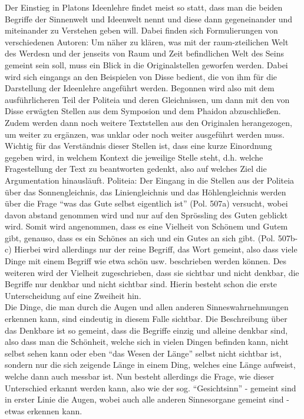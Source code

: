 Der Einstieg in Platons Ideenlehre findet meist so statt, dass man die beiden Begriffe der Sinnenwelt und Ideenwelt nennt und diese dann gegeneinander und miteinander zu Verstehen geben will. Dabei finden sich Formulierungen von verschiedenen Autoren: 
Um näher zu klären, was mit der raum-zteilichen Welt des Werdesn und der jenseits von Raum und Zeit befindlichen Welt des Seins gemeint sein soll, muss ein Blick in die Originalstellen geworfen werden. Dabei wird sich eingangs an den Beispielen von Disse bedient, die von ihm für die Darstellung der Ideenlehre angeführt werden. Begonnen wird also mit dem ausführlicheren Teil der Politeia und deren Gleichnissen, um dann mit den von Disse erwägten Stellen aus dem Symposion und dem Phaidon abzuschließen. Zudem werden dann noch weitere Textstellen aus den Originalen herangezogen, um weiter zu ergänzen, was unklar oder noch weiter ausgeführt werden muss. Wichtig für das Verständnis dieser Stellen ist, dass eine kurze Einordnung gegeben wird, in welchem Kontext die jeweilige Stelle steht, d.h. welche Fragestellung der Text zu beantworten gedenkt, also auf welches Ziel die Argumentation hinausläuft.
Politeia:
Der Eingang in die Stellen aus der Politeia über das Sonnengleichnis, das Liniengleichnis und das Höhlengleichnis werden über die Frage \enquote{was das Gute selbst eigentlich ist} (Pol. 507a) versucht, wobei davon abstand genommen wird und nur auf den Sprössling des Guten geblickt wird. Somit wird angenommen, dass es eine Vielheit von Schönem und Gutem gibt, genauso, dass es ein Schönes an sich und ein Gutes an sich gibt. (Pol. 507b-c) Hierbei wird allerdings nur der reine Begriff, das Wort gemeint, also dass viele Dinge mit einem Begriff wie etwa schön usw. beschrieben werden können. Des weiteren wird der Vielheit zugeschrieben, dass sie sichtbar und nicht denkbar, die Begriffe nur denkbar und nicht sichtbar sind. Hierin besteht schon die erste Unterscheidung auf eine Zweiheit hin.\\
Die Dinge, die man durch die Augen und allen anderen Sinneswahrnehmungen erkennen kann, sind eindeutig in diesem Falle sichtbar. Die Beschreibung über das Denkbare ist so gemeint, dass die Begriffe einzig und alleine denkbar sind, also dass man die Schönheit, welche sich in vielen Dingen befinden kann, nicht selbst sehen kann oder eben \enquote{das Wesen der Länge} selbst nicht sichtbar ist, sondern nur die sich zeigende Länge in einem Ding, welches eine Länge aufweist, welche dann auch messbar ist. Nun besteht allerdings die Frage, wie dieser Unterschied erkannt werden kann, also wie der sog. \enquote{Gesichtsinn} - gemeint sind in erster Linie die Augen, wobei auch alle anderen Sinnesorgane gemeint sind - etwas erkennen kann.
